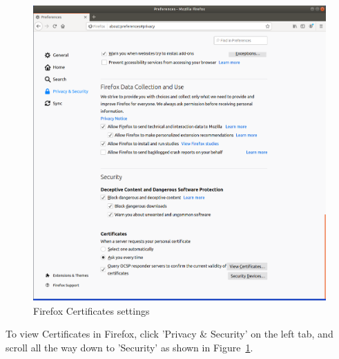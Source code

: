\documentclass[12pt]{article}
\begin{document}
    \begin{figure}[H]
        \begin{center}
            \includegraphics[scale=0.5]{t4_5.png}
        \end{center}{}
        \caption{Firefox Certificates settings}
        \label{fig:t4_5}
    \end{figure}

To view Certificates in Firefox, click 'Privacy & Security' on the left tab, and scroll all the way down to 'Security' as shown in Figure~\ref{fig:t4_5}.
    
\end{document}
